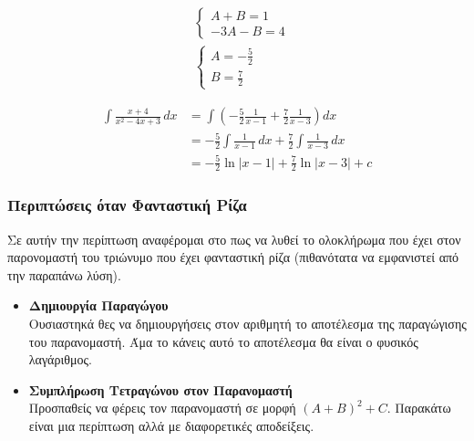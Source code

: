 \documentclass[a4paper,12pt]{article}
\begin{document}
\noindent
\begin{minipage}[t]{0.42\textwidth}
\[
\begin{aligned}
&\begin{cases} A + B = 1 \\ -3A - B = 4 \end{cases} \\[10pt]
&\begin{cases} A = -\frac{5}{2} \\[6pt] B = \frac{7}{2} \end{cases}
\end{aligned}
\]
\end{minipage}%
\hfill
\begin{minipage}[t]{0.55\textwidth}
\[
\begin{aligned}
\int \frac{x+4}{x^2-4x+3} \, dx &= \int \left( -\frac{5}{2}\frac{1}{x-1} + \frac{7}{2}\frac{1}{x-3} \right) dx \\
&= -\frac{5}{2} \int \frac{1}{x-1} \, dx + \frac{7}{2} \int \frac{1}{x-3} \, dx \\
&= -\frac{5}{2} \ln|x-1| + \frac{7}{2} \ln|x-3| + c
\end{aligned}
\]
\end{minipage}

\subsubsection*{Περιπτώσεις όταν Φανταστική Ρίζα}

Σε αυτήν την περίπτωση αναφέρομαι στο πως να λυθεί το ολοκλήρωμα που έχει στον παρονο\-μαστή του τριώνυμο που
έχει φανταστική ρίζα (πιθανότατα να εμφανιστεί από την παραπάνω λύση).

\begin{itemize}
    \item \textbf{Δημιουργία Παραγώγου}\\
    Ουσιαστηκά θες να δημιουργήσεις στον αριθμητή το αποτέλεσμα της παραγώγισης του παρανομαστή. Άμα το κάνεις αυτό 
    το αποτέλεσμα θα είναι ο φυσικός λαγάριθμος.

    \item \textbf{Συμπλήρωση Τετραγώνου στον Παρανομαστή}\\
    Προσπαθείς να φέρεις τον παρανομαστή σε μορφή $(A+B)^2 + C$. Παρακάτω είναι μια περίπτωση αλλά με διαφορετικές αποδείξεις. 
\end{itemize}
\vspace{-0.5em}
\end{document}
